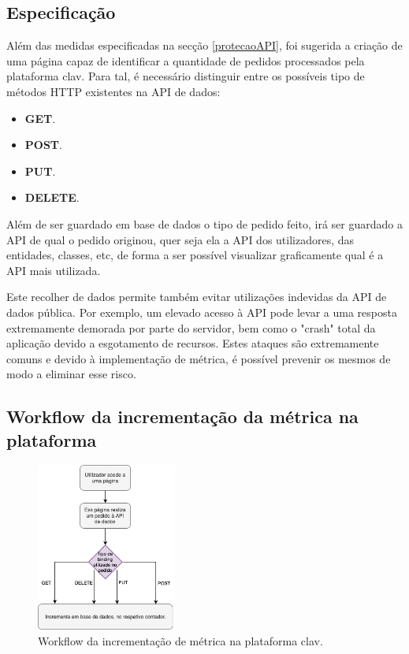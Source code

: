 \subsection{Especificação}
\vspace{-4mm}
Além das medidas especificadas na secção \ref{protecaoAPI}, foi sugerida a criação de uma página capaz de identificar a quantidade de pedidos processados pela plataforma \gls{clav}. Para tal, é necessário distinguir entre os possíveis tipo de métodos HTTP existentes na API de dados: 
\vspace{-3mm}
\begin{itemize}
    \item \textbf{GET}.
    \vspace{-1.5mm}
    \item \textbf{POST}.
    \vspace{-1.5mm}
    \item \textbf{PUT}.
    \vspace{-1.5mm}
    \item \textbf{DELETE}.
\end{itemize}

\vspace{-1mm}
Além de ser guardado em base de dados o tipo de pedido feito, irá ser guardado a API de qual o pedido originou, quer seja ela a API dos utilizadores, das entidades, classes, etc, de forma a ser possível visualizar graficamente qual é a API mais utilizada.

Este recolher de dados permite também evitar utilizações indevidas da API de dados pública. Por exemplo, um elevado acesso à API pode levar a uma resposta extremamente demorada por parte do servidor, bem como o "crash" total da aplicação devido a esgotamento de recursos. Estes ataques são extremamente comuns e devido à implementação de métrica, é possível prevenir os mesmos de modo a eliminar esse risco.

\vspace{-6mm}
\subsection{Workflow da incrementação da métrica na plataforma}
\vspace{-10mm}
\begin{figure}[ht!]
    \centering
    \includegraphics[width=0.41\textwidth]{img/diagramas/gestaometrica/Metrica.png}
    \caption{Workflow da incrementação de métrica na plataforma \gls{clav}.}
    \label{fig:flow_Metrica}
\end{figure}


